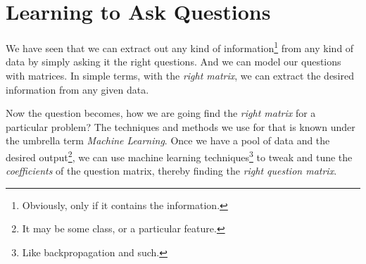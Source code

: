 \documentclass[../../main]{subfiles}
\begin{document}
\section{Learning to Ask Questions} \label{sec:}

We have seen that we can extract out any kind of information\footnote{Obviously, only if it
contains the information.} from any kind of data by simply asking it the right questions.
And we can model our questions with matrices. In simple terms, with the \emph{right matrix},
we can extract the desired information from any given data.

Now the question becomes, how we are going find the \emph{right matrix} for a particular problem?
The techniques and methods we use for that is known under the umbrella term \emph{Machine Learning}. Once we
have a pool of data and the desired output\footnote{It may be some class, or a particular feature.},
we can use machine learning techniques\footnote{Like backpropagation and such.} to tweak and tune
the \emph{coefficients} of the question matrix, thereby finding the \emph{right question matrix}.
\end{document}
